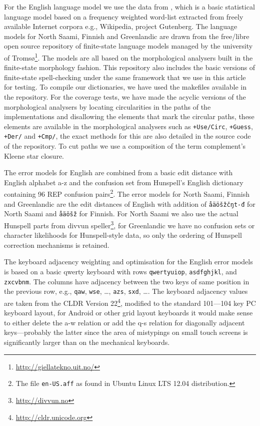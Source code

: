 \documentclass[a4paper,12pt]{article}
\begin{document}
For the English language model we use the data from
\cite{norvig/2010,pirinen2012effects}, which is a basic statistical language
model based on a frequency weighted word-list extracted from freely available
Internet corpora e.g., Wikipedia, project Gutenberg.  The language models for
North Saami, Finnish and Greenlandic are drawn from the free/libre open source
repository of finite-state language models managed by the university of
Tromsø\footnote{\url{http://giellatekno.uit.no/}}. The models are all based on
the morphological analysers built in the finite-state morphology
\cite[]{beesley2003finite} fashion. This repository also includes the basic
versions of finite-state spell-checking under the same framework that we use in
this article for testing. To compile our dictionaries, we have used the
makefiles available in the repository.  For the coverage tests, we have made
the acyclic versions of the morphological analysers by locating circularities
in the paths of the implementations and disallowing the elements that mark the
circular paths, these elements are available in the morphological analysers
such as \texttt{+Use/Circ}, \texttt{+Guess}, \texttt{+Der/} and \texttt{+Cmp/},
the exact methods for this are also detailed in the source code of the
repository.  To cut paths we use a composition of the term complement's Kleene
star closure.

The error models for English are combined from a basic edit distance with
English alphabet a-z and the confusion set from Hunspell's English dictionary
containing 96 REP confusion pairs\footnote{The file \texttt{en-US.aff} as found
in Ubuntu Linux LTS 12.04 distribution.}. The error models for North Saami,
Finnish and Greenlandic are the edit distances of English with addition of
\texttt{åäöšžčŋ{t\hspace{-.35em}-}đ}
for North Saami and \texttt{åäöšž} for Finnish. For North
Saami we also use the actual Hunspell parts from divvun
speller\footnote{\url{http://divvun.no}}, for Greenlandic we have no confusion
sets or character likelihoods for Hunspell-style data, so only the ordering of
Hunspell correction mechanisms is retained.

The keyboard adjacency weighting and optimisation for the English error models
is based on a basic qwerty keyboard with rows \texttt{qwertyuiop},
\texttt{asdfghjkl}, and \texttt{zxcvbnm}. The columns have adjacency between
the two keys of same position in the previous row, e.g., \texttt{qaw},
\texttt{wse}, \ldots, \texttt{azs}, \texttt{sxd}, \ldots.  The keyboard
adjacency values are taken from the CLDR Version
22\footnote{\url{http://cldr.unicode.org}}, modified to the standard 101---104
key PC keyboard layout, for Android or other grid layout keyboards it would
make sense to either delete the a-w relation or add the q-s relation for
diagonally adjacent keys---probably the latter since the area of mistypings on
small touch screens is significantly larger than on the mechanical keyboards.
\end{document}
